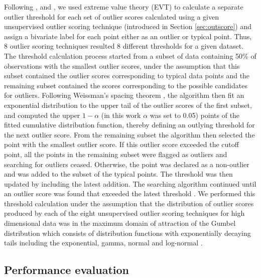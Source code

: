 \documentclass[draft]{agujournal2018} %
\begin{document}
Following \citet{schwarz2008wind}, \citet{burridge2006additive}
and \citet{wilkinsonvisualizing}, we used extreme value theory (EVT)
to calculate \color{black} a separate outlier threshold  for each set of outlier scores calculated using a given unsupervised outlier scoring technique  (introduced in Section
\ref{sec:outscore}) \color{black} and assign a bivariate label
for each point either as an outlier or typical point. \color{black} Thus, 8 outlier scoring techniques resulted 8 different thresholds for a given dataset. \color{black} The threshold
calculation process started from a subset of data \color{black} containing 50\% \color{black} of
observations with the smallest outlier scores, under the assumption that
this subset contained the outlier scores corresponding to typical data
points and the remaining subset contained the scores corresponding to
the possible candidates for outliers. Following Weissman's spacing
theorem \citep{weissman1978estimation}, the algorithm then fit an
exponential distribution to the upper tail of the outlier scores of the
first subset, and computed the upper \(1-\alpha\) (in this work
\(\alpha\) was set to 0.05) points of the fitted cumulative distribution
function, thereby defining an outlying threshold for the next outlier
score. From the remaining subset the algorithm then selected the point
with the smallest outlier score. If this outlier score exceeded the
cutoff point, all the points in the remaining subset were flagged as
outliers and searching for outliers ceased. Otherwise, the point was
declared as a non-outlier and was added to the subset of the typical
points. The threshold was then updated by including the latest addition.
The searching algorithm continued until an outlier score was found that
exceeded the latest threshold \citep{schwarz2008wind}. We performed
this threshold calculation under the assumption that the distribution of
outlier scores produced by each of the eight unsupervised outlier
scoring techniques for high dimensional data was in the maximum domain
of attraction of the Gumbel distribution which consists of distribution
functions with exponentially decaying tails including the exponential,
gamma, normal and log-normal \citep{embrechts2013modelling}.

\subsection{Performance evaluation}\label{sec:evaluation}
\end{document}
